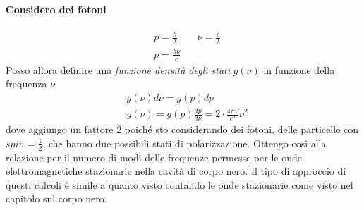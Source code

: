 \paragraph{Considero dei fotoni}
\begin{equation}
\begin{split}
& p = \frac{ h }{\lambda } \quad\quad \nu = \frac{ c}{\lambda } \\
& p = \frac{ h\nu}{c }
\end{split}
\end{equation}
Posso allora definire una \textit{funzione densità degli stati} $g(\nu)$ in funzione della frequenza $\nu$
\begin{equation}
\begin{split}
& g(\nu)d\nu = g(p)dp \\
& g(\nu) = g(p)\frac{ dp}{d\nu } = 2 \cdot \frac{ 4\pi V}{c^3 } \nu^2
\end{split}
\end{equation}
dove aggiungo un fattore $2$ poiché sto considerando dei fotoni, delle particelle con $spin=\frac{ 1}{2 }$, che hanno due possibili stati di polarizzazione.
Ottengo così alla relazione per il numero di modi delle frequenze permesse per le onde elettromagnetiche stazionarie nella cavità di corpo nero.
Il tipo di approccio di questi calcoli è simile a quanto visto contando le onde stazionarie come visto nel capitolo sul corpo nero.




